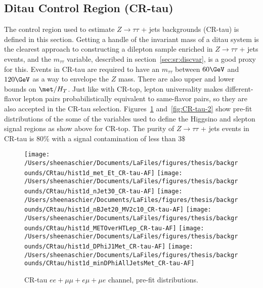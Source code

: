 \subsection{Ditau Control Region (CR-tau)}
The control region used to estimate $Z\rightarrow\tau\tau$ + jets backgrounds (CR-tau) is defined in this section.  Getting a handle of the invariant mass of a ditau system is the clearest approach to constructing a dilepton sample enriched in $Z\rightarrow\tau\tau$ + jets events, and the $m_{\tau\tau}$ variable, described in section~\ref{sec:sr:discvar}, is a good proxy for this.  Events in CR-tau are required to have an $m_{\tau\tau}$ between $60 \GeV$ and $120 \GeV$ as a way to envelope the $Z$ mass.  There are also upper and lower bounds on $\met/H_T$.  Just like with CR-top, lepton universality makes different-flavor lepton pairs probabilistically equivalent to same-flavor pairs, so they are also accepted in the CR-tau selection.  Figures~\ref{fig:CR-tau-1} and~\ref{fig:CR-tau-2} show pre-fit distributions of the some of the variables used to define the Higgsino and slepton signal regions as show above for CR-top.  The purity of $Z\rightarrow\tau\tau$ + jets events in CR-tau is $80\%$ with a signal contamination of less than $3\$$
\begin{figure}
    \centering
        \texttt{[image: /Users/sheenaschier/Documents/LaFiles/figures/thesis/backgrounds/CRtau/hist1d\_met\_Et\_CR-tau-AF]}
        \texttt{[image: /Users/sheenaschier/Documents/LaFiles/figures/thesis/backgrounds/CRtau/hist1d\_nJet30\_CR-tau-AF]}
        \texttt{[image: /Users/sheenaschier/Documents/LaFiles/figures/thesis/backgrounds/CRtau/hist1d\_nBJet20\_MV2c10\_CR-tau-AF]}
        \texttt{[image: /Users/sheenaschier/Documents/LaFiles/figures/thesis/backgrounds/CRtau/hist1d\_METOverHTLep\_CR-tau-AF]}
        \texttt{[image: /Users/sheenaschier/Documents/LaFiles/figures/thesis/backgrounds/CRtau/hist1d\_DPhiJ1Met\_CR-tau-AF]}
        \texttt{[image: /Users/sheenaschier/Documents/LaFiles/figures/thesis/backgrounds/CRtau/hist1d\_minDPhiAllJetsMet\_CR-tau-AF]}
    \caption{CR-tau $ee+\mu\mu +e\mu + \mu e$ channel, pre-fit distributions.}
    \label{fig:CR-tau-1}
\end{figure} 

